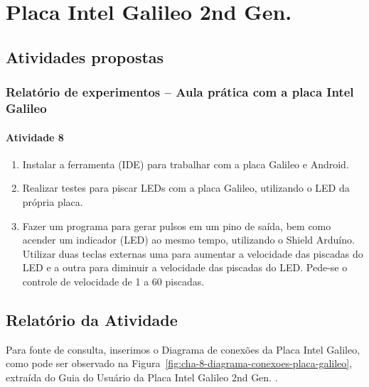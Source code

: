 \documentclass[
	12pt,				%
	openright,			%
  oneside,     %
	a4paper,			%
	english,			%
	french,				%
	spanish,			%
	brazil				%
	]{abntex2}
\begin{document}




\chapter{Placa Intel Galileo 2nd Gen.} %
\label{cha:Placa-Intel-Galileu}

\section{Atividades propostas} %
\label{sec:RPlaca-Intel-Galileu-atividades_propostas}

\subsection*{Relatório de experimentos – Aula prática com a placa Intel Galileo}

\subsubsection*{Atividade 8}

\begin{enumerate}
  \item Instalar a ferramenta (IDE) para trabalhar com a placa Galileo e Android.
  \item Realizar testes para piscar LEDs com a placa Galileo, utilizando o LED da própria placa.
  \item Fazer um programa para gerar pulsos em um pino de saída, bem como acender um indicador (LED) ao mesmo tempo, utilizando o Shield Arduíno. Utilizar duas teclas externas uma para aumentar a velocidade das piscadas do LED e a outra para diminuir a velocidade das piscadas do LED. Pede-se o controle de velocidade de 1 a 60 piscadas.
\end{enumerate}

\section{Relatório da Atividade} %
\label{sec:consideracoes-Placa-Intel-Galileu}

Para fonte de consulta, inserimos o Diagrama de conexões da Placa Intel Galileo, como pode ser observado na Figura~\ref{fig:cha-8-diagrama-conexoes-placa-galileo}, extraída do Guia do Usuário da Placa Intel Galileo 2nd Gen. \cite{Corporation2014}.
\end{document}
